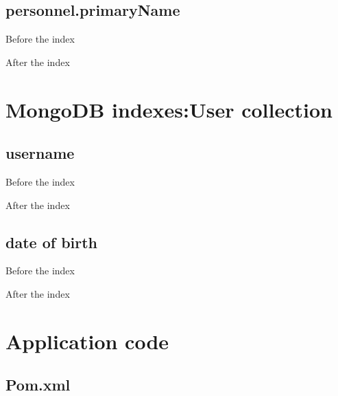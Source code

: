 \begin{alphasection}
\subsection{personnel.primaryName}
Before the index

After the index

\section{MongoDB indexes:User collection}
\subsection{username}
Before the index

After the index

\subsection{date of birth}
Before the index

After the index


\section{Application code}
\subsection{Pom.xml}\label{subsec:pom}


\end{alphasection}
%
